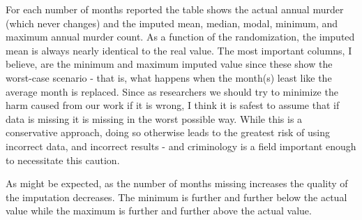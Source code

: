 \documentclass[
]{krantz}
\begin{document}
For each number of months reported the table shows the
actual annual murder (which never changes) and the imputed
mean, median, modal, minimum, and maximum annual murder
count. As a function of the randomization, the imputed mean
is always nearly identical to the real value. The most
important columns, I believe, are the minimum and maximum
imputed value since these show the worst-case scenario -
that is, what happens when the month(s) least like the
average month is replaced. Since as researchers we should
try to minimize the harm caused from our work if it is
wrong, I think it is safest to assume that if data is
missing it is missing in the worst possible way. While this
is a conservative approach, doing so otherwise leads to the
greatest risk of using incorrect data, and incorrect results
- and criminology is a field important enough to necessitate
this caution.

As might be expected, as the number of months missing
increases the quality of the imputation decreases. The
minimum is further and further below the actual value while
the maximum is further and further above the actual value.
\end{document}
